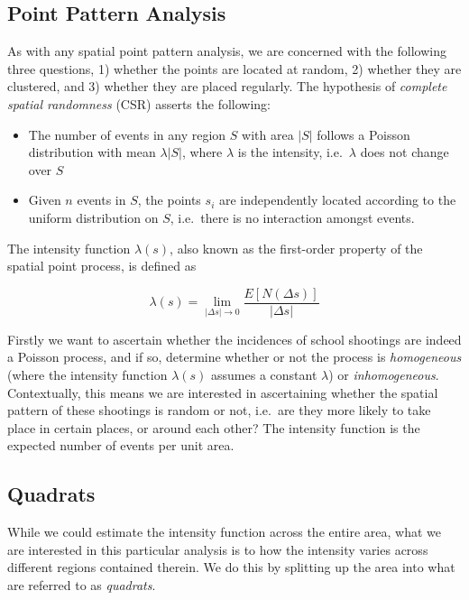 \documentclass[12pt]{article}
\providecommand{\tightlist}{%
  \setlength{\itemsep}{0pt}\setlength{\parskip}{0pt}}
\begin{document}
\hypertarget{point-pattern-analysis}{%
\subsection{Point Pattern Analysis}\label{point-pattern-analysis}}

As with any spatial point pattern analysis, we are concerned with the following three questions, 1) whether the points are located at random, 2) whether they are clustered, and 3) whether they are placed regularly. The hypothesis of \emph{complete spatial randomness} (CSR) asserts the following:

\begin{itemize}
\tightlist
\item
  The number of events in any region \(S\) with area \(|S|\) follows a Poisson distribution with mean \(\lambda |S|\), where \(\lambda\) is the intensity, i.e.~\(\lambda\) does not change over \(S\)
\item
  Given \(n\) events in \(S\), the points \(s_i\) are independently located according to the uniform distribution on \(S\), i.e.~there is no interaction amongst events.
\end{itemize}

The intensity function \(\lambda(s)\), also known as the first-order property of the spatial point process, is defined as

\[\lambda(s) = \lim_{|\Delta s| \to 0} \frac{E[N(\Delta s)]}{| \Delta s|}\]

Firstly we want to ascertain whether the incidences of school shootings are indeed a Poisson process, and if so, determine whether or not the process is \emph{homogeneous} (where the intensity function \(\lambda(s)\) assumes a constant \(\lambda\)) or \emph{inhomogeneous}. Contextually, this means we are interested in ascertaining whether the spatial pattern of these shootings is random or not, i.e.~are they more likely to take place in certain places, or around each other? The intensity function is the expected number of events per unit area.

\hypertarget{quadrats}{%
\subsection{Quadrats}\label{quadrats}}

While we could estimate the intensity function across the entire area, what we are interested in this particular analysis is to how the intensity varies across different regions contained therein. We do this by splitting up the area into what are referred to as \emph{quadrats}.
\end{document}
